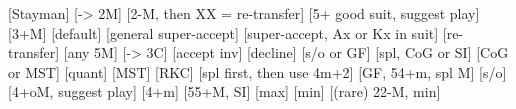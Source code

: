 \begin{bidsemi}
[Stayman]
[-> 2M]
        [2-M, then XX = re-transfer]
        [5+ good suit, suggest play]
        [3+M]
    [default]
    [general super-accept]
    [super-accept, Ax or Kx in suit]
        [re-transfer]
    [any 5M]
[-> 3C]
    [accept inv]
    [decline]
[s/o or GF]
    [spl, CoG or SI]
    [CoG or MST]
    [quant]
    [MST]
    [RKC]
    [spl first, then use 4m+2]
[GF, 54+m, spl M]
    [s/o]
    [4+oM, suggest play]
    [4+m]
[55+M, SI]
    [max]
    [min]
    [(rare) 22-M, min]
\end{bidsemi}
